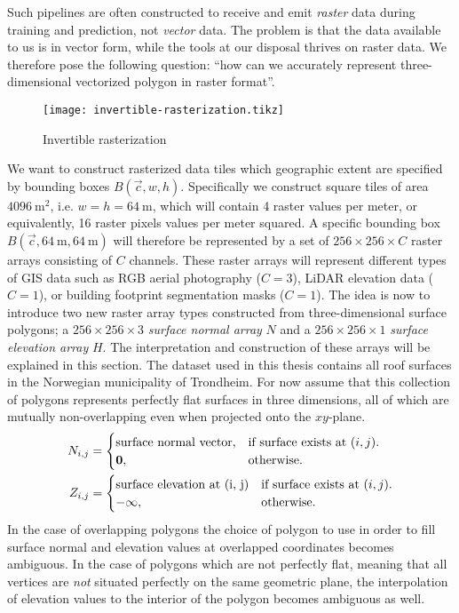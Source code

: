Such pipelines are often constructed to receive and emit \emph{raster} data during training and prediction, not \emph{vector} data.
The problem is that the data available to us is in vector form, while the tools at our disposal thrives on raster data.
We therefore pose the following question: \enquote{how can we accurately represent three-dimensional vectorized polygon in raster format}.

\begin{figure}
  \begin{center}
    \texttt{[image: invertible-rasterization.tikz]}
  \end{center}
  \vspace{-1.5em}
  \caption{Invertible rasterization}
  \label{fig:invertible-rasterization}
  \vspace{-1.5em}
\end{figure}
We want to construct rasterized data tiles which geographic extent are specified by bounding boxes $B(\vec{c}, w, h)$.
Specifically we construct square tiles of area $\SI{4096}{\meter\squared}$, i.e. $w = h = \SI{64}{\meter}$, which will contain \num{4} raster values per meter, or equivalently, \num{16} raster pixels values per meter squared.
A specific bounding box $B(\vec{c}, \SI{64}{\meter}, \SI{64}{\meter})$ will therefore be represented by a set of $256 \times 256 \times C$ raster arrays consisting of $C$ channels.
These raster arrays will represent different types of GIS data such as RGB aerial photography ($C = 3$), LiDAR elevation data ($C = 1$), or building footprint segmentation masks ($C = 1$).
The idea is now to introduce two new raster array types constructed from three-dimensional surface polygons; a $256 \times 256 \times 3$ \textit{surface normal array} $N$ and a $256 \times 256 \times 1$ \textit{surface elevation array} $H$.
The interpretation and construction of these arrays will be explained in this section.
The dataset used in this thesis contains all roof surfaces in the Norwegian municipality of Trondheim.
For now assume that this collection of polygons represents perfectly flat surfaces in three dimensions, all of which are mutually non-overlapping even when projected onto the $xy$-plane.
%
\begin{align*}
  N_{i,j} &= \begin{cases}
    \text{surface normal vector,} &\text{if surface exists at } (i, j).\\
    \vec{0}, &\text{otherwise.}
  \end{cases}
  \\
  Z_{i,j} &= \begin{cases}
    \text{surface elevation at } $(i, j)$ &\text{if surface exists at } (i, j).\\
    -\infty, &\text{otherwise.}
  \end{cases}
\end{align*}
%
In the case of overlapping polygons the choice of polygon to use in order to fill surface normal and elevation values at overlapped coordinates becomes ambiguous.
In the case of polygons which are not perfectly flat, meaning that all vertices are \emph{not} situated perfectly on the same geometric plane, the interpolation of elevation values to the interior of the polygon becomes ambiguous as well.

